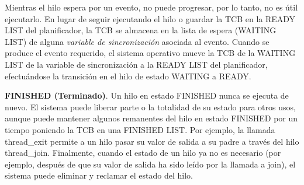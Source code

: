 \documentclass[10pt]{book}
\begin{document}
Mientras el hilo espera por un evento, no puede progresar, por lo tanto, no es útil ejecutarlo. En lugar de seguir ejecutando el hilo o guardar la TCB en la READY LIST del planificador, la TCB se almacena en la lista de espera (WAITING LIST) de alguna \textit{variable de sincronización} asociada al evento. Cuando se produce el evento requerido, el sistema operativo mueve la TCB de la WAITING LIST de la variable de sincronización a la READY LIST del planificador, efectuándose la transición en el hilo de estado WAITING a READY.

\textbf{FINISHED (Terminado)}. Un hilo en estado FINISHED nunca se ejecuta de nuevo. El sistema puede liberar parte o la totalidad de su estado para otros usos, aunque puede mantener algunos remanentes del hilo en estado FINISHED por un tiempo poniendo la TCB en una FINISHED LIST. Por ejemplo, la llamada {\mf thread\_exit} permite a un hilo pasar su valor de salida a su padre a través del hilo {\mf thread\_join}. Finalmente, cuando el estado de un hilo ya no es necesario (por ejemplo, después de que su valor de salida ha sido leído por la llamada a {\mf join}), el sistema puede eliminar y reclamar el estado del hilo.
\end{document}
